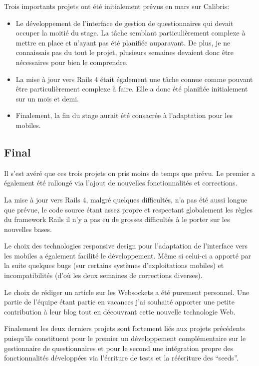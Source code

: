 \documentclass[12pt,a4paper]{book}
\begin{document}
Trois importants projets ont été initialement prévus en mars sur Calibris:
\begin{itemize}
	\item Le développement de l'interface de gestion de questionnaires qui devait occuper la moitié du stage. La tâche semblant particulièrement complexe à mettre en place et n'ayant pas été planifiée auparavant. De plus, je ne connaissais pas du tout le projet, plusieurs semaines devaient donc être nécessaires pour bien le comprendre.
	\item La mise à jour vers Rails 4 était également une tâche connue comme pouvant être particulièrement complexe à faire. Elle a donc été planifiée initialement sur un mois et demi.
	\item Finalement, la fin du stage aurait été consacrée à l'adaptation pour les mobiles.
\end{itemize}

\subsection{Final}

Il s'est avéré que ces trois projets on pris moins de temps que prévu. Le premier a également été rallongé via l'ajout de nouvelles fonctionnalités et corrections.

La mise à jour vers Rails 4, malgré quelques difficultés, n'a pas été aussi longue que prévue, le code source étant assez propre et respectant globalement les règles du framework Rails il n'y a pas eu de grosses difficultés à le porter sur les nouvelles bases.

Le choix des technologies responsive design pour l'adaptation de l'interface vers les mobiles a également facilité le développement. Même si celui-ci a apporté par la suite quelques bugs (sur certains systèmes d'exploitations mobiles) et incompatibilités (d'où les deux semaines de corrections diverses).

Le choix de rédiger un article sur les Websockets a été purement personnel. Une partie de l'équipe étant partie en vacances j'ai souhaité apporter une petite contribution à leur blog tout en découvrant cette nouvelle technologie Web.

Finalement les deux derniers projets sont fortement liés aux projets précédents puisqu'ils constituent pour le premier un développement complémentaire sur le gestionnaire de questionnaires et pour le second une intégration propre des fonctionnalités développées via l'écriture de tests et la réécriture des ``seeds''.
\end{document}
